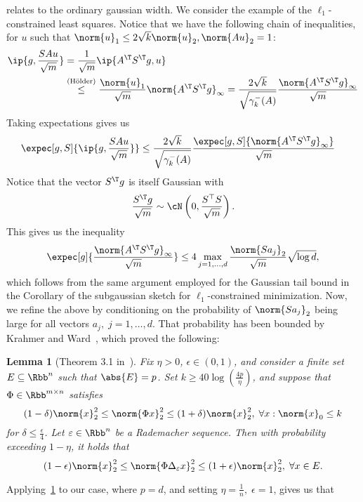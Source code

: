 \documentclass[a4paper]{article}
\newtheorem{lemma}{Lemma}
\begin{document}
relates to the ordinary gaussian width. We consider the example of the
$\ell_1$-constrained least squares. Notice that we have the following chain of
inequalities, for $u$ such that $\norm{u}_1 \leq 2 \sqrt{k} \norm{u}_2,
\norm{Au}_2 = 1$:
\begin{align*}
	\ip{g, \frac{S A u}{\sqrt{m}}} &= \frac{1}{\sqrt{m}}\ip{A^\T S^\T g, u} \\
		&\overset{(\text{H{\"o}lder})}{\leq} \frac{\norm{u}_1}{\sqrt{m}}
		 \norm{A^\T S^\T g}_{\infty} = \frac{2 \sqrt{k}}{\sqrt{\gamma_k^-(A)}}
		 \frac{\norm{A^\T S^\T g}_{\infty}}{\sqrt{m}}
\end{align*}
Taking expectations gives us
\begin{align*}
	\expec[g, S]{\ip{g, \frac{S A u}{\sqrt{m}}}} &\leq
	\frac{2 \sqrt{k}}{\sqrt{\gamma_k^-(A)}}
	\frac{\expec[g, S]{\norm{A^\T S^\T g}_{\infty}}}{\sqrt{m}}
\end{align*}
Notice that the vector $S^\T g$ is itself Gaussian with
\[
	\frac{S^\T g}{\sqrt{m}} \sim \cN\left(0, \frac{S^\top S}{\sqrt{m}} \right).
\]
This gives us the inequality
\[
	\expec[g]{\frac{\norm{A^\T S^\T g}_{\infty}}{\sqrt{m}}}
	\leq 4 \max_{j=1, \dots, d} \frac{\norm{S a_j}_2}{\sqrt{m}}
		\sqrt{\log d},
\]
which follows from the same argument employed for the Gaussian tail bound in
the Corollary of the subgaussian sketch for $\ell_1$-constrained minimization.
Now, we refine the above by conditioning on the probability of $\norm{S a_j}_2$
being large for all vectors $a_j, \; j = 1, \dots, d$.
That probability has been bounded by Krahmer and Ward~\cite{KraWard11}, which
proved the following:
\begin{lemma}[Theorem 3.1 in~\cite{KraWard11}]
	\label{lemma:JL_embedding_rademacher}
	Fix $\eta > 0$, $\epsilon \in (0, 1)$, and consider a finite set $E
	\subseteq \Rbb^n$ such that $\abs{E} = p$. Set $k \geq 40
	\log\left(\frac{4p}{\eta}\right)$, and suppose that $\Phi \in \Rbb^{m \times
	n}$ satisfies
	\[
		(1 - \delta) \norm{x}_2^2 \leq \norm{\Phi x}_2^2 \leq
		(1 + \delta) \norm{x}_2^2, \; \forall x : \norm{x}_0 \leq k
	\]
	for $\delta \leq \frac{\epsilon}{4}$. Let $\varepsilon \in \Rbb^n$ be a
		Rademacher sequence. Then with probability exceeding $1 - \eta$, it
		holds that
	\[
		(1 - \epsilon) \norm{x}_2^2 \leq
		\norm{\Phi \Delta_{\varepsilon} x}_2^2 \leq
		(1 + \epsilon) \norm{x}_2^2, \;
		\forall x \in E.
	\]
\end{lemma}
Applying~\cref{lemma:JL_embedding_rademacher} to our case, where $p = d$, and
setting $\eta = \frac{1}{n}, \; \epsilon = 1$, gives us that
\end{document}
